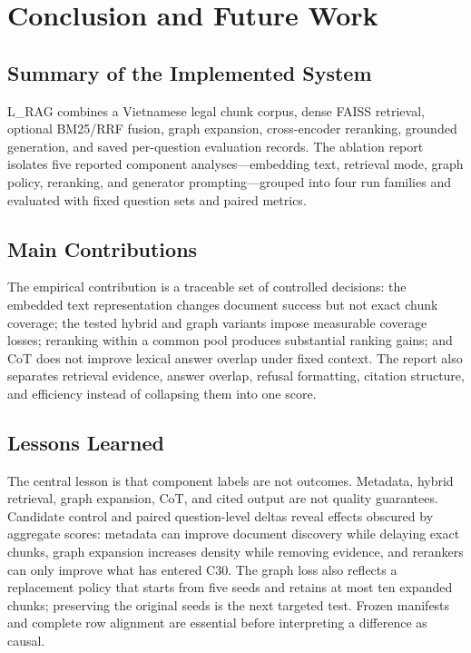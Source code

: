 \section{Conclusion and Future Work}
\label{sec:conclusion-future-work}

\subsection{Summary of the Implemented System}
\label{sec:summary-implemented-system}

L\_RAG combines a Vietnamese legal chunk corpus, dense FAISS retrieval,
optional BM25/RRF fusion, graph expansion, cross-encoder reranking, grounded
generation, and saved per-question evaluation records. The ablation report
isolates five reported component analyses---embedding text, retrieval mode,
graph policy, reranking, and generator prompting---grouped into four run
families and evaluated with fixed question sets and paired metrics.

\subsection{Main Contributions}
\label{sec:main-contributions}

The empirical contribution is a traceable set of controlled decisions: the
embedded text representation changes document success but not exact chunk
coverage; the tested hybrid and graph variants impose measurable coverage
losses; reranking within a common pool produces substantial ranking gains; and
CoT does not improve lexical answer overlap under fixed context. The report
also separates retrieval evidence, answer overlap, refusal formatting,
citation structure, and efficiency instead of collapsing them into one score.

\subsection{Lessons Learned}
\label{sec:lessons-learned}

The central lesson is that component labels are not outcomes. Metadata,
hybrid retrieval, graph expansion, CoT, and cited output are not quality
guarantees. Candidate control and paired question-level deltas reveal effects
obscured by aggregate scores: metadata can improve document discovery while
delaying exact chunks, graph expansion increases density while removing
evidence, and rerankers can only improve what has entered C30. The graph loss
also reflects a replacement policy that starts from five seeds and retains at
most ten expanded chunks; preserving the original seeds is the next targeted
test. Frozen manifests and complete row alignment are essential before
interpreting a difference as causal.


